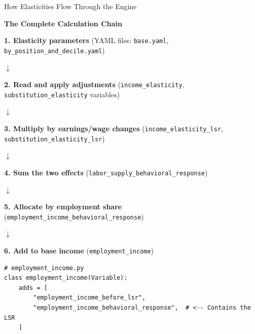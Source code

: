 \documentclass[11pt,aspectratio=169]{beamer}
\begin{document}
\begin{frame}[fragile]{How Elasticities Flow Through the Engine}
\begin{center}
\textbf{The Complete Calculation Chain}
\end{center}

\vspace{0.2cm}
\scriptsize

\textbf{1. Elasticity parameters} (YAML files: \texttt{base.yaml}, \texttt{by\_position\_and\_decile.yaml})

$\downarrow$

\textbf{2. Read and apply adjustments} (\texttt{income\_elasticity}, \texttt{substitution\_elasticity} variables)

$\downarrow$

\textbf{3. Multiply by earnings/wage changes} (\texttt{income\_elasticity\_lsr}, \texttt{substitution\_elasticity\_lsr})

$\downarrow$

\textbf{4. Sum the two effects} (\texttt{labor\_supply\_behavioral\_response})

$\downarrow$

\textbf{5. Allocate by employment share} (\texttt{employment\_income\_behavioral\_response})

$\downarrow$

\textbf{6. Add to base income} (\texttt{employment\_income})

\vspace{0.3cm}

\begin{verbatim}
# employment_income.py
class employment_income(Variable):
    adds = [
        "employment_income_before_lsr",
        "employment_income_behavioral_response",  # <-- Contains the LSR
    ]
\end{verbatim}

\end{frame}
\end{document}

